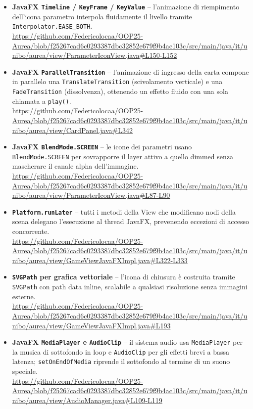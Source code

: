 \documentclass[11pt, a4paper, oneside]{report}
\begin{document}
\begin{itemize}
    \item \textbf{JavaFX \texttt{Timeline} / \texttt{KeyFrame} / \texttt{KeyValue}} --
        l'animazione di riempimento dell'icona parametro interpola
        fluidamente il livello tramite \texttt{Interpolator.EASE\_BOTH}. \\
        \url{https://github.com/Federicolocaa/OOP25-Aurea/blob/f25267cad6c0293387dbc32852e679f9b4ac103c/src/main/java/it/unibo/aurea/view/ParameterIconView.java#L150-L152}

    \item \textbf{JavaFX \texttt{ParallelTransition}} -- l'animazione di
        ingresso della carta compone in parallelo una
        \texttt{TranslateTransition} (scivolamento verticale) e una
        \texttt{FadeTransition} (dissolvenza), ottenendo un effetto
        fluido con una sola chiamata a \texttt{play()}. \\
        \url{https://github.com/Federicolocaa/OOP25-Aurea/blob/f25267cad6c0293387dbc32852e679f9b4ac103c/src/main/java/it/unibo/aurea/view/CardPanel.java#L342}

    \item \textbf{JavaFX \texttt{BlendMode.SCREEN}} -- le icone dei parametri
        usano \texttt{BlendMode.SCREEN} per sovrapporre il layer attivo
        a quello dimmed senza mascherare il canale alpha dell'immagine. \\
        \url{https://github.com/Federicolocaa/OOP25-Aurea/blob/f25267cad6c0293387dbc32852e679f9b4ac103c/src/main/java/it/unibo/aurea/view/ParameterIconView.java#L87-L90}

    \item \textbf{\texttt{Platform.runLater}} -- tutti i metodi della View
        che modificano nodi della scena delegano l'esecuzione al thread
        JavaFX, prevenendo eccezioni di accesso concorrente. \\
        \url{https://github.com/Federicolocaa/OOP25-Aurea/blob/f25267cad6c0293387dbc32852e679f9b4ac103c/src/main/java/it/unibo/aurea/view/GameViewJavaFXImpl.java#L322-L333}

    \item \textbf{\texttt{SVGPath} per grafica vettoriale} -- l'icona di
        chiusura è costruita tramite \texttt{SVGPath} con path data
        inline, scalabile a qualsiasi risoluzione senza immagini esterne. \\
        \url{https://github.com/Federicolocaa/OOP25-Aurea/blob/f25267cad6c0293387dbc32852e679f9b4ac103c/src/main/java/it/unibo/aurea/view/GameViewJavaFXImpl.java#L193}
    \item \textbf{JavaFX \texttt{MediaPlayer} e \texttt{AudioClip}} -- 
        il sistema audio usa \texttt{MediaPlayer} per la musica di 
        sottofondo in loop e \texttt{AudioClip} per gli effetti brevi 
        a bassa latenza; \texttt{setOnEndOfMedia} riprende il sottofondo 
        al termine di un suono speciale. \\
        \url{https://github.com/Federicolocaa/OOP25-Aurea/blob/f25267cad6c0293387dbc32852e679f9b4ac103c/src/main/java/it/unibo/aurea/view/AudioManager.java#L109-L119}
\end{itemize}
\end{document}
